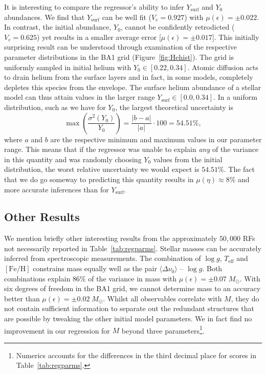 It is interesting to compare the regressor's ability to infer $Y_{\text{surf}}$ and $Y_0$ abundances. We find that  $Y_{\text{surf}}$ can be well fit (${V_e = 0.927}$) with ${\mu (\epsilon) = \pm 0.022}$. In contrast, the initial abundance, $Y_0$, cannot be confidently retrodicted  (${V_e=0.625}$) yet results in a smaller average error [${\mu (\epsilon) = \pm 0.017}$]. 
This initially surprising result can be understood through examination of the respective parameter distributions in the BA1 grid (Figure~\ref{fig:Hehist}).
The grid is uniformly sampled in initial helium with ${Y_0 \in [0.22, 0.34]}$. 
Atomic diffusion acts to drain helium from the surface layers and in fact, in some models, completely depletes this species from the envelope. 
The surface helium abundance of a stellar model can thus attain values in the larger range
${Y_{\text{surf}} \in [0.0, 0.34]}$.  %
In a  uniform distribution, such as we have for $Y_0$, the largest theoretical uncertainty  is 
\begin{equation}
    \max \left( \frac{\sigma^2(Y_0)}{Y_0} \right) = \frac{|b-a|}{|a|} \cdot 100 = 54.51\%,
\end{equation}
where $a$ and $b$ are the respective minimum and maximum values in our parameter range.  
This means that if the regressor was unable to explain \emph{any} of the variance in this quantity and was randomly choosing $Y_0$ values from the initial distribution, the worst relative uncertainty we would expect is $54.51\%$. The fact that we do go someway to predicting this quantity results in ${\mu (\eta) \approx 8\% }$ and more accurate inferences than for $Y_{\text{surf}}$. 







\subsection{Other Results}
We mention briefly other interesting results from the approximately $50,000$ RFs not necessarily reported in Table~\ref{tab:regparms}.
Stellar masses can be accurately inferred from spectroscopic measurements. The combination of  ${\log{} g}$, $T_{\text{eff}}$ and $[\text{Fe/H}]$ constrains mass equally well as the pair ${\langle\Delta\nu_0\rangle}$ -- ${\log{} g}$. Both combinations explain 
 $86\%$ of the variance in mass with ${\mu (\epsilon) = \pm 0.07 \; M_{\odot}}$. With six degrees of freedom in the BA1 grid, we cannot determine mass to an accuracy better than  ${\mu (\epsilon) = \pm 0.02\;M_{\odot}}$.  
 Whilst all observables correlate with $M$, they do not contain sufficient information to separate out the redundant structures that are possible by tweaking the other initial model parameters. We in fact find no improvement in our regression for $M$ beyond three parameters\footnote{Numerics accounts for the differences in the third decimal place for scores in Table~\ref{tab:regparms}.}. 

